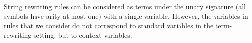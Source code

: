 \begin{remark}
String rewriting rules can be considered as terms under the unary signature (all symbols have arity at most one) with a single variable.
However, the variables in rules that we consider do not correspond to standard variables in the term-rewriting setting, 
but to context variables.   
\end{remark}